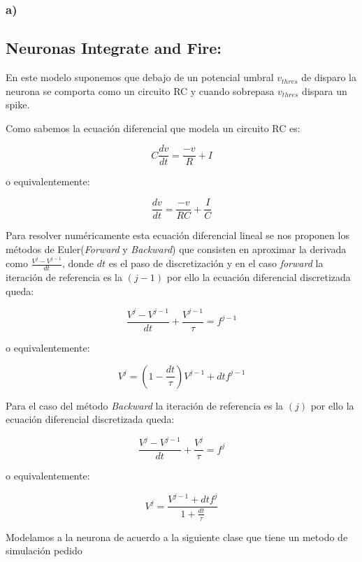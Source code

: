 \documentclass{article}
\begin{document}
    \subsubsection{a)}

\subsection{Neuronas Integrate and Fire:}

En este modelo suponemos que debajo de un potencial umbral $v_{thres}$
de disparo la neurona se comporta como un circuito RC y cuando sobrepasa
$v_{thres}$ dispara un spike.

Como sabemos la ecuación diferencial que modela un circuito RC es:

\[C\frac{dv}{dt}=\frac{-v}{R}+I\]

o equivalentemente:

\[\frac{dv}{dt}=\frac{-v}{RC}+\frac{I}{C}\]

Para resolver numéricamente esta ecuación diferencial lineal se nos
proponen los métodos de Euler(\emph{Forward} y \emph{Backward}) que
consisten en aproximar la derivada como $\frac{V^{j}-V^{j-1}}{dt}$,
donde $dt$ es el paso de discretización y en el caso \emph{forward} la
iteración de referencia es la $(j-1)$ por ello la ecuación diferencial
discretizada queda:

\[\frac{V^{j}-V^{j-1}}{dt} + \frac{V^{j-1}}{\tau}=f^{j-1}\]

o equivalentemente:

\[V^{j}=(1-\frac{dt}{\tau}) V^{j-1}+dt f^{j-1}\]

Para el caso del método \emph{Backward} la iteración de referencia es la
$(j)$ por ello la ecuación diferencial discretizada queda:

\[\frac{V^{j}-V^{j-1}}{dt} + \frac{V^{j}}{\tau}=f^{j}\]

o equivalentemente:

\[V^{j}=\frac{V^{j-1}+dt f^{j}}{1+\frac{dt}{\tau}}\]

Modelamos a la neurona de acuerdo a la siguiente clase que tiene un
metodo de simulación pedido
\end{document}
